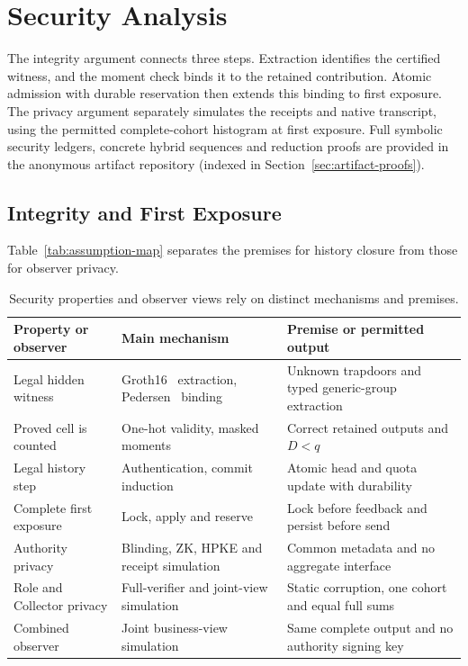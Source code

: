 \documentclass[conference,compsoc]{IEEEtran}
\theoremstyle{definition}
\numberwithin{equation}{section}
\numberwithin{table}{section}
\numberwithin{figure}{section}
\theoremstyle{plain}
\begin{document}
\section{Security Analysis}
\label{sec:security-summary}

The integrity argument connects three steps. Extraction identifies the
certified witness, and the moment check binds it to the retained contribution.
Atomic admission with durable reservation then extends this binding to first exposure. The
privacy argument separately simulates the receipts and native transcript,
using the permitted complete-cohort histogram at first exposure.
Full symbolic security ledgers, concrete hybrid sequences and reduction proofs are provided in the anonymous artifact repository (indexed in Section~\ref{sec:artifact-proofs}).

\subsection{Integrity and First Exposure}

Table~\ref{tab:assumption-map} separates the premises for history closure
from those for observer privacy.

\begin{table}[t]
\centering
\caption{Security properties and observer views rely on distinct mechanisms and premises.}
\label{tab:assumption-map}
\label{tab:privacy-domain}
\footnotesize
\renewcommand{\arraystretch}{1.08}
\begin{tabularx}{\columnwidth}{@{}YYY@{}}
\toprule
\textbf{Property or observer} & \textbf{Main mechanism} & \textbf{Premise or permitted output} \\
\midrule
Legal hidden witness & Groth16~\cite{Groth2016pairing} extraction, Pedersen~\cite{Pedersen1991Commitment} binding & Unknown trapdoors and typed generic-group extraction \\
Proved cell is counted & One-hot validity, masked moments & Correct retained outputs and \(D<q\) \\
Legal history step & Authentication, commit induction & Atomic head and quota update with durability \\
Complete first exposure & Lock, apply and reserve & Lock before feedback and persist before send \\
Authority privacy & Blinding, ZK, HPKE and receipt simulation & Common metadata and no aggregate interface \\
Role and Collector privacy & Full-verifier and joint-view simulation & Static corruption, one cohort and equal full sums \\
Combined observer & Joint business-view simulation & Same complete output and no authority signing key \\
\bottomrule
\end{tabularx}
\end{table}
\end{document}

